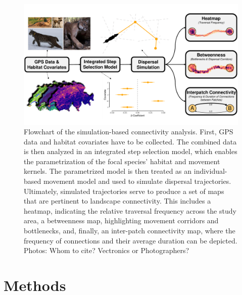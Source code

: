 \documentclass[abstract=on,10pt,a4paper,bibliography=totocnumbered]{article}
\begin{document}
\begin{figure}[htbp]
  \begin{center}
    \includegraphics[width = \textwidth]{99_GraphicalAbstract.pdf}
    \caption{Flowchart of the simulation-based connectivity analysis. First, GPS
    data and habitat covariates have to be collected. The combined data is then
    analyzed in an integrated step selection model, which enables the
    parametrization of the focal species' habitat and movement kernels. The
    parametrized model is then treated as an individual-based movement model and
    used to simulate dispersal trajectories. Ultimately, simulated trajectories
    serve to produce a set of maps that are pertinent to landscape connectivity.
    This includes a heatmap, indicating the relative traversal frequency across
    the study area, a betweenness map, highlighting movement corridors and
    bottlenecks, and, finally, an inter-patch connectivity map, where the
    frequency of connections and their average duration can be depicted. Photos:
    Whom to cite? Vectronics or Photographers?}
    \label{GraphicalAbstract}
  \end{center}
\end{figure}

\section{Methods}
\end{document}
